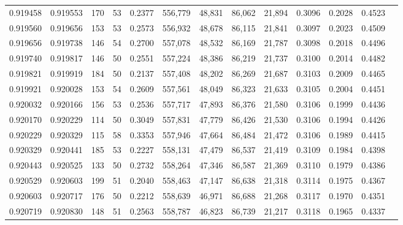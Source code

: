 \begin{tabular}{rrrrrrrrrrrrr}
0.919458 & 0.919553 &   170 &  53 &                                     0.2377 & 556,779 &  48,831 &  86,062 &  21,894 & 0.3096 & 0.2028 & 0.4523 \\
0.919560 & 0.919656 &   153 &  53 &                                     0.2573 & 556,932 &  48,678 &  86,115 &  21,841 & 0.3097 & 0.2023 & 0.4509 \\
0.919656 & 0.919738 &   146 &  54 &                                     0.2700 & 557,078 &  48,532 &  86,169 &  21,787 & 0.3098 & 0.2018 & 0.4496 \\
0.919740 & 0.919817 &   146 &  50 &                                     0.2551 & 557,224 &  48,386 &  86,219 &  21,737 & 0.3100 & 0.2014 & 0.4482 \\
0.919821 & 0.919919 &   184 &  50 &                                     0.2137 & 557,408 &  48,202 &  86,269 &  21,687 & 0.3103 & 0.2009 & 0.4465 \\
0.919921 & 0.920028 &   153 &  54 &                                     0.2609 & 557,561 &  48,049 &  86,323 &  21,633 & 0.3105 & 0.2004 & 0.4451 \\
0.920032 & 0.920166 &   156 &  53 &                                     0.2536 & 557,717 &  47,893 &  86,376 &  21,580 & 0.3106 & 0.1999 & 0.4436 \\
0.920170 & 0.920229 &   114 &  50 &                                     0.3049 & 557,831 &  47,779 &  86,426 &  21,530 & 0.3106 & 0.1994 & 0.4426 \\
0.920229 & 0.920329 &   115 &  58 &                                     0.3353 & 557,946 &  47,664 &  86,484 &  21,472 & 0.3106 & 0.1989 & 0.4415 \\
0.920329 & 0.920441 &   185 &  53 &                                     0.2227 & 558,131 &  47,479 &  86,537 &  21,419 & 0.3109 & 0.1984 & 0.4398 \\
0.920443 & 0.920525 &   133 &  50 &                                     0.2732 & 558,264 &  47,346 &  86,587 &  21,369 & 0.3110 & 0.1979 & 0.4386 \\
0.920529 & 0.920603 &   199 &  51 &                                     0.2040 & 558,463 &  47,147 &  86,638 &  21,318 & 0.3114 & 0.1975 & 0.4367 \\
0.920603 & 0.920717 &   176 &  50 &                                     0.2212 & 558,639 &  46,971 &  86,688 &  21,268 & 0.3117 & 0.1970 & 0.4351 \\
0.920719 & 0.920830 &   148 &  51 &                                     0.2563 & 558,787 &  46,823 &  86,739 &  21,217 & 0.3118 & 0.1965 & 0.4337 \\

\end{tabular}
